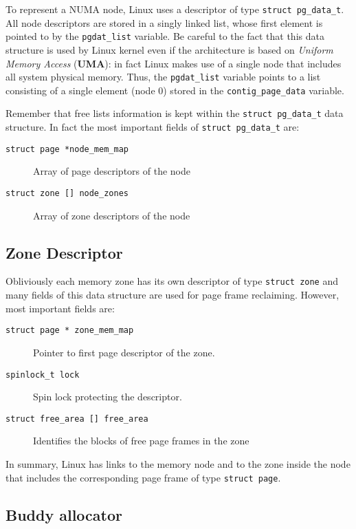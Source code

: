 \documentclass[10pt,a4paper]{article}
\begin{document}
To represent a NUMA node, Linux uses a descriptor of type \texttt{struct pg\_data\_t}. All node descriptors are stored in a singly linked list, whose first
element is pointed to by the \texttt{pgdat\_list} variable. Be careful to the fact that this data structure is used by Linux kernel even if the architecture is based on \textit{Uniform Memory Access} (\textbf{UMA}): in fact Linux makes use of a single node that includes all system physical memory. Thus, the \texttt{pgdat\_list} variable points to a list consisting of a single element (node 0) stored in the \texttt{contig\_page\_data} variable.

Remember that free lists information is kept within the \texttt{struct pg\_data\_t} data structure. In fact the most important fields of \texttt{struct pg\_data\_t} are:

\begin{description}
\item[\texttt{struct page *node\_mem\_map}] Array of page descriptors of the node
\item[\texttt{struct zone [] node\_zones}] Array of zone descriptors of the node
\end{description}

\subsection{Zone Descriptor}

Obliviously each memory zone has its own descriptor of type \texttt{struct zone} and many fields of this data structure are used for page frame reclaiming. However, most important fields are:

\begin{description}
\item[\texttt{struct page * zone\_mem\_map}] Pointer to first page descriptor of the zone.
\item[\texttt{spinlock\_t lock}] Spin lock protecting the descriptor.
\item[\texttt{struct free\_area [] free\_area}] Identifies the blocks of free page frames in the zone
\end{description}

In summary, Linux has links to the memory node and to the zone inside the node that includes the corresponding page frame of type \texttt{struct page}.

\subsection{Buddy allocator}
\end{document}
